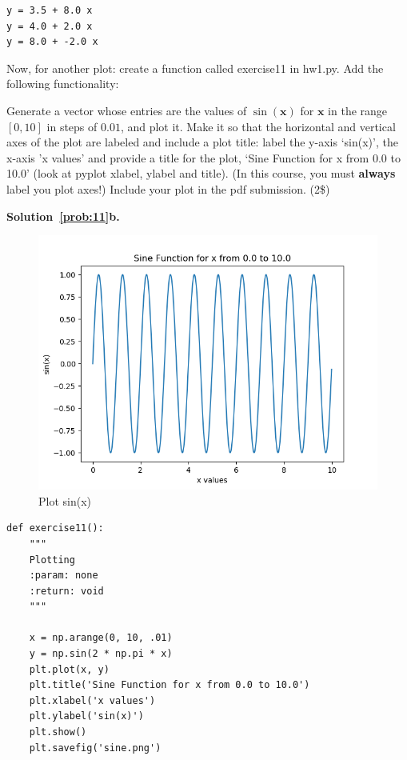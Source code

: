 \documentclass[10pt]{article}
\begin{document}
\begin{enumerate}
\begin{figure}
\end{figure}

\begin{verbatim}
y = 3.5 + 8.0 x
y = 4.0 + 2.0 x
y = 8.0 + -2.0 x
\end{verbatim}

Now, for another plot: create a function called exercise11 in hw1.py.  Add the following functionality:

Generate a vector whose entries are the values of $\sin(\mathbf{x})$ for $\mathbf{x}$ in the range $[0,10]$ in steps of $0.01$, and plot it.  Make it so that the horizontal and vertical axes of the plot are labeled and include a plot title: label the y-axis `sin(x)', the x-axis 'x values' and provide a title for the plot, `Sine Function for x from 0.0 to 10.0' (look at pyplot xlabel, ylabel and title).  (In this course, you must {\bf always} label you plot axes!)  Include your plot in the pdf submission. (2\$)

{\bf Solution~\ref{prob:11}b.} 

\begin{figure}

\centering
  \includegraphics[width=\linewidth]{code/sine.png}
 \caption{Plot sin(x)}
\label{label}

\end{figure}

\begin{verbatim}
def exercise11():
    """
    Plotting
    :param: none
    :return: void
    """

    x = np.arange(0, 10, .01)
    y = np.sin(2 * np.pi * x)
    plt.plot(x, y)
    plt.title('Sine Function for x from 0.0 to 10.0')
    plt.xlabel('x values')
    plt.ylabel('sin(x)')
    plt.show()
    plt.savefig('sine.png')
\end{verbatim}




\end{enumerate}
\end{document}
